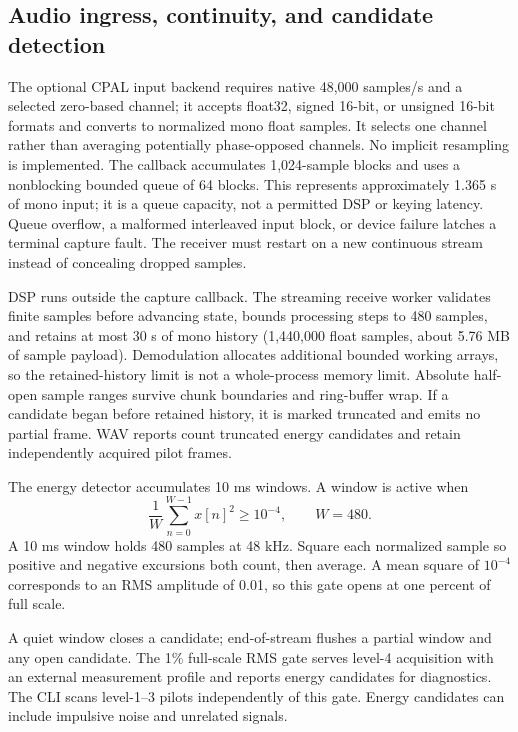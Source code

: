 \providecommand{\modemcite}[1]{}

\subsection{Audio ingress, continuity, and candidate detection}
The optional CPAL input backend requires native 48,000 samples/s and a selected
zero-based channel; it accepts float32, signed 16-bit, or unsigned 16-bit
formats and converts to normalized mono float samples. It selects one channel
rather than averaging potentially phase-opposed channels. No implicit
resampling is implemented. The callback accumulates 1,024-sample blocks and
uses a nonblocking bounded queue of 64 blocks. This represents approximately
1.365 s of mono input; it is a queue capacity, not a permitted DSP or keying
latency. Queue overflow, a malformed interleaved input block, or device failure
latches a terminal capture fault. The receiver must restart on a new continuous
stream instead of concealing dropped samples.

DSP runs outside the capture callback. The streaming receive worker validates
finite samples before advancing state, bounds processing steps to 480 samples,
and retains at most 30 s of mono history (1,440,000 float samples, about
5.76 MB of sample payload). Demodulation allocates additional bounded working
arrays, so the retained-history limit is not a whole-process memory limit.
Absolute half-open sample ranges survive chunk boundaries and ring-buffer
wrap. If a candidate began before retained history, it is marked truncated and
emits no partial frame. WAV reports count truncated energy candidates and
retain independently acquired pilot frames.

The energy detector accumulates 10 ms windows. A window is active when
\[
 \frac{1}{W}\sum_{n=0}^{W-1}x[n]^2 \geq 10^{-4},\qquad W=480.
\]
A 10 ms window holds 480 samples at 48 kHz. Square each normalized
sample so positive and negative excursions both count, then average.
A mean square of $10^{-4}$ corresponds to an RMS amplitude of 0.01,
so this gate opens at one percent of full scale.

A quiet window closes a candidate; end-of-stream flushes a partial window and
any open candidate. The 1\% full-scale RMS gate serves level-4 acquisition
with an external measurement profile and reports energy candidates for
diagnostics. The CLI scans level-1--3 pilots independently of this gate.
Energy candidates can include impulsive noise and unrelated signals.

